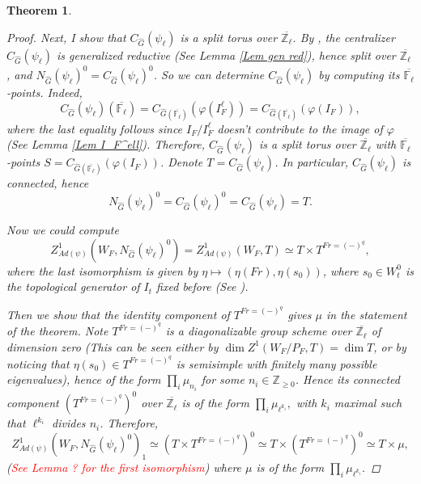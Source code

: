 \documentclass{article}
\newcommand{\red}[1]{\textcolor{red}{#1}}
\newtheorem{theorem}{Theorem}
\begin{document}
\begin{theorem}
\begin{proof}
    	Next, I show that $C_{\hat{G}}(\psi_{\ell})$ is a split torus over $\overline{\mathbb{Z}_{\ell}}$. By \cite[Subsection 3.1]{dat2022ihes}, the centralizer $C_{\hat{G}}(\psi_{\ell})$ is generalized reductive (See Lemma \ref{Lem gen red}), hence split over $\overline{\mathbb{Z}_{\ell}}$, and $N_{\hat{G}}(\psi_{\ell})^0=C_{\hat{G}}(\psi_{\ell})^0$. So we can determine $C_{\hat{G}}(\psi_{\ell})$ by computing its $\overline{\mathbb{F}_{\ell}}$-points. Indeed,
    	$$C_{\hat{G}}(\psi_{\ell})(\overline{\mathbb{F}_{\ell}})=C_{\hat{G}(\overline{\mathbb{F}_{\ell}})}(\varphi(I_F^\ell))=C_{\hat{G}(\overline{\mathbb{F}_{\ell}})}(\varphi(I_F)),$$
    	where the last equality follows since $I_F/I_F^{\ell}$ doesn't contribute to the image of $\varphi$ (See Lemma \ref{Lem I_F^ell}). Therefore, $C_{\hat{G}}(\psi_{\ell})$ is a split torus over $\overline{\mathbb{Z}_{\ell}}$ with $\overline{\mathbb{F}_{\ell}}$-points $S=C_{\hat{G}(\overline{\mathbb{F}_{\ell}})}(\varphi(I_F))$. Denote $T=C_{\hat{G}}(\psi_{\ell})$. In particular, $C_{\hat{G}}(\psi_{\ell})$  is connected, hence 
    	$$N_{\hat{G}}(\psi_{\ell})^0=C_{\hat{G}}(\psi_{\ell})^0=C_{\hat{G}}(\psi_{\ell})=T.$$
    	
    	Now we could compute
    	$$Z^1_{Ad(\psi)}(W_F, N_{\hat{G}}(\psi_{\ell})^0)=Z^1_{Ad(\psi)}(W_F, T) \simeq T \times T^{Fr=(-)^q},$$
    	where the last isomorphism is given by $\eta \mapsto (\eta(Fr), \eta(s_0))$, where $s_0 \in W_t^0$ is the topological generator of $I_t$ fixed before (See \cite[Example 3.14]{dat2022ihes}).
    	
    	Then we show that the identity component of $T^{Fr=(-)^q}$ gives $\mu$ in the statement of the theorem. Note $T^{Fr=(-)^q}$ is a diagonalizable group scheme over $\overline{\mathbb{Z}_{\ell}}$ of dimension zero (This can be seen either by $\dim Z^1(W_F/P_F, T)=\dim T$, or by noticing that $\eta(s_0) \in T^{Fr=(-)^q}$ is semisimple with finitely many possible eigenvalues), hence of the form $\prod_i\mu_{n_i}$ for some $n_i \in \mathbb{Z}_{\geq 0}$. Hence its connected component $(T^{Fr=(-)^q})^0$ over $\overline{\mathbb{Z}_{\ell}}$ is of the form $\prod_i\mu_{\ell^{k_i}},$ with $k_i$ maximal such that $\ell^{k_i}$ divides $n_i$. Therefore, 
    	$$Z^1_{Ad(\psi)}(W_F, N_{\hat{G}}(\psi_{\ell})^0)_1 \simeq (T \times T^{Fr=(-)^q})^0 \simeq T \times (T^{Fr=(-)^q})^0 \simeq T \times \mu,$$
    	(\red{See Lemma ? for the first isomorphism}) where $\mu$ is of the form $\prod_i\mu_{\ell^{k_i}}$.
    	

\end{proof}
\end{theorem}
\end{document}
